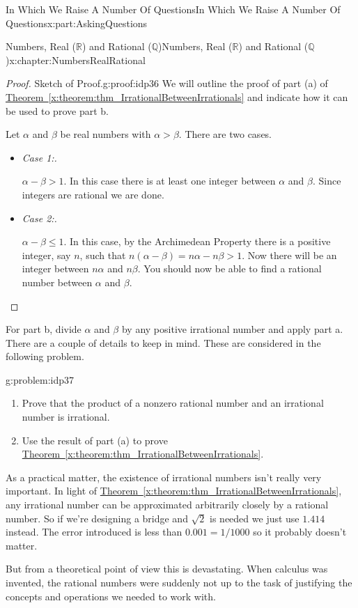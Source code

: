 \documentclass[oneside,10pt,]{book}
\newcommand{\xreffont}{\relax}
\newcommand{\lititle}[1]{{\slshape#1}}
\numberwithin{equation}{section}
\newcommand{\RR}{\mathbb {R}}
\newcommand{\QQ}{\mathbb {Q}}
\begin{document}
\begin{partptx}{In Which We Raise A Number Of Questions}{}{In Which We Raise A Number Of Questions}{}{}{x:part:AskingQuestions}
\begin{chapterptx}{Numbers, Real (\(\RR\)) and Rational (\(\QQ\))}{}{Numbers, Real (\(\RR\)) and Rational (\(\QQ\))}{}{}{x:chapter:NumbersRealRational}
\begin{introduction}{}
\begin{proof}{Sketch of Proof.}{g:proof:idp36}
We will outline the proof of part (a) of \hyperref[x:theorem:thm_IrrationalBetweenIrrationals]{Theorem~{\xreffont\ref{x:theorem:thm_IrrationalBetweenIrrationals}}} and indicate how it can be used to prove part b.%
\par
Let \(\alpha\) and \(\beta\) be real numbers with \(\alpha > \beta\). There are two cases.%
\begin{itemize}[label=\textbullet]
\item{}\lititle{Case 1:.}\par%
\(\alpha-\beta > 1\). In this case there is at least one integer between \(\alpha\) and \(\beta\). Since integers are rational we are done.%
\item{}\lititle{Case 2:.}\par%
\(\alpha-\beta \le 1\).  In this case, by the Archimedean Property there is a positive integer, say \(n\), such that \(n(\alpha-\beta) = n\alpha-n\beta
> 1\).  Now there will be an integer between \(n\alpha\) and \(n\beta\).  You should now be able to find a rational number between \(\alpha\) and \(\beta\).%
\end{itemize}
%
\end{proof}
For part b, divide \(\alpha\) and \(\beta\) by any positive irrational number and apply part a. There are a couple of details to keep in mind. These are considered in the following problem.%
\begin{problem}{}{g:problem:idp37}%
\begin{enumerate}[font=\bfseries,label=(\alph*),ref=\alph*]
\item{}Prove that the product of a nonzero rational number and an irrational number is irrational.%
\item{}Use the result of part (a) to prove \hyperref[x:theorem:thm_IrrationalBetweenIrrationals]{Theorem~{\xreffont\ref{x:theorem:thm_IrrationalBetweenIrrationals}}}.%
\end{enumerate}
\end{problem}
As a practical matter, the existence of irrational numbers isn't really very important. In light of \hyperref[x:theorem:thm_IrrationalBetweenIrrationals]{Theorem~{\xreffont\ref{x:theorem:thm_IrrationalBetweenIrrationals}}}, any irrational number can be approximated arbitrarily closely by a rational number. So if we're designing a bridge and \(\sqrt{2}\) is needed we just use \(1.414\) instead. The error introduced is less than \(0.001 =1/1000\) so it probably doesn't matter.%
\par
But from a theoretical point of view this is devastating. When calculus was invented, the rational numbers were suddenly not up to the task of justifying the concepts and operations we needed to work with.%

\end{introduction}
\end{chapterptx}
\end{partptx}
\end{document}
